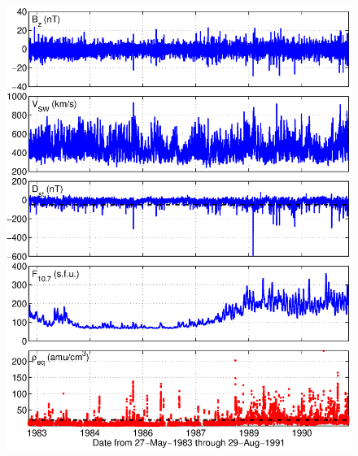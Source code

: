 \documentclass[12pt]{article}
\begin{document}
	
	\begin{figure}[htp!]
		\centering
		\includegraphics[scale=0.45]{2016SW001507R-p01.eps}
	\end{figure}
	
	
	
	\clearpage
	
\end{document}

